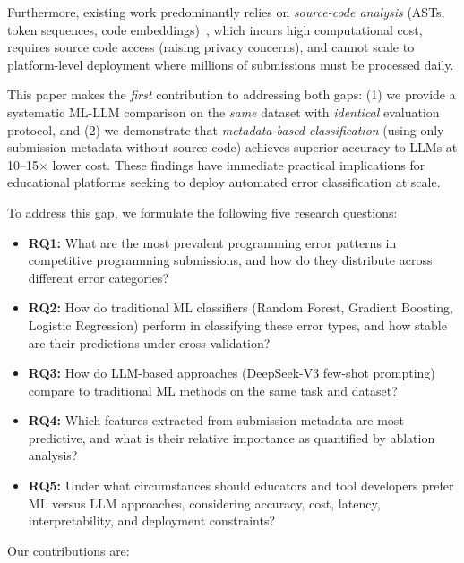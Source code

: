 \documentclass[10pt,a4paper]{article}
\begin{document}
Furthermore, existing work predominantly relies on \textit{source-code
analysis} (ASTs, token sequences, code
embeddings)~\cite{wang2017learning,feng2020codebert}, which incurs high
computational cost, requires source code access (raising privacy concerns),
and cannot scale to platform-level deployment where millions of submissions
must be processed daily.

This paper makes the \textit{first} contribution to addressing both gaps:
(1) we provide a systematic ML-LLM comparison on the \textit{same} dataset
with \textit{identical} evaluation protocol, and (2) we demonstrate that
\textit{metadata-based classification} (using only submission metadata without
source code) achieves superior accuracy to LLMs at 10--15$\times$ lower cost.
These findings have immediate practical implications for educational platforms
seeking to deploy automated error classification at scale.

To address this gap, we formulate the following five research questions:

\begin{itemize}
    \item \textbf{RQ1:} What are the most prevalent programming error patterns
          in competitive programming submissions, and how do they distribute
          across different error categories?
    \item \textbf{RQ2:} How do traditional ML classifiers (Random Forest,
          Gradient Boosting, Logistic Regression) perform in classifying these
          error types, and how stable are their predictions under cross-validation?
    \item \textbf{RQ3:} How do LLM-based approaches (DeepSeek-V3
          few-shot prompting) compare to traditional ML methods on the same task
          and dataset?
    \item \textbf{RQ4:} Which features extracted from submission metadata are
          most predictive, and what is their relative importance as quantified
          by ablation analysis?
    \item \textbf{RQ5:} Under what circumstances should educators and tool
          developers prefer ML versus LLM approaches, considering accuracy,
          cost, latency, interpretability, and deployment constraints?
\end{itemize}

Our contributions are:
\end{document}

